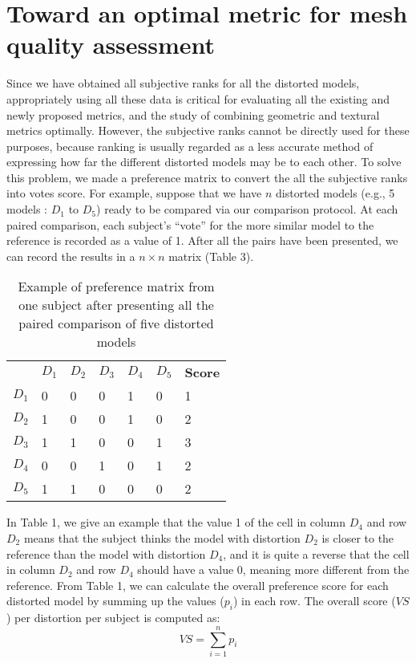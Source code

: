 \section{Toward an optimal metric for mesh quality assessment}
Since we have obtained all subjective ranks for all the distorted models, appropriately using all these data is critical for evaluating all the existing and newly proposed metrics, and the study of combining geometric and textural metrics optimally. However, the subjective ranks cannot be directly used for these purposes, because ranking is usually regarded as a less accurate method of expressing how far the different distorted models may be to each other.  To solve this problem, we made a preference matrix \cite{Ledda_2005} to convert the all the subjective ranks into votes score. For example, suppose that we have $n$ distorted models (e.g., 5 models : $D_1$ to $D_5$) ready to be compared via our comparison protocol.   At each paired comparison, each subject’s “vote” for the more similar model to the reference is recorded as a value of 1. After all the pairs have been presented, we can record the results in a $n \times n$ matrix (Table 3).
\begin{table}[]
\centering
\caption{Example of preference matrix from one subject after presenting all the paired comparison of five distorted models}
\label{my-label}
\begin{tabular}{lllllll}
            & $D_1$ & $D_2$ & $D_3$ & $D_4$ & $D_5$ & \textbf{Score} \\
$D_1$ & 0           & 0           & 0           & 1           & 0           & 1     \\
$D_2$ & 1           & 0           & 0           & 1           & 0           & 2     \\
$D_3$ & 1           & 1           & 0           & 0           & 1           & 3     \\
$D_4$ & 0           & 0           & 1           & 0           & 1           & 2     \\
$D_5$ & 1           & 1           & 0           & 0           & 0           & 2    
\end{tabular}
\end{table}
In Table 1, we give an example that the value 1 of the cell in column $D_4$ and row $D_2$ means that the subject thinks the model with distortion $D_2$ is closer to the reference than the model with distortion $D_4$, and it is quite a reverse that the cell in column $D_2$ and row $D_4$ should have a value 0, meaning more different from the reference. From Table 1, we can calculate the overall preference score for each distorted model by summing up the values ($p_i$) in each row. The overall score ($VS$) per distortion per subject is computed as:
\begin{equation}
VS =\sum_{i=1}^n{p_i}
\end{equation}